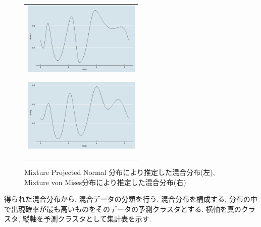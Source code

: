 \documentclass[a4j,12pt]{jarticle}
\begin{document}
\begin{figure}[tbp]
 \begin{tabular}{c}
\hspace{0.5cm}
 \begin{minipage}{0.5\hsize}
  \begin{center}
   \includegraphics[clip,height= 35mm]{data/mix_pn.png}
  \end{center}
  \label{pnmix}
 \end{minipage}
\hspace{-1.0cm}
 \begin{minipage}{0.5\hsize}
  \begin{center}
   \includegraphics[clip,height= 35mm]{data/mix_von.png}
  \end{center}
  \label{vonmix}
 \end{minipage}
  \end{tabular}
\caption{Mixture Projected Normal 分布により推定した混合分布(左), Mixture von Mises分布により推定した混合分布(右)}
\end{figure}


得られた混合分布から, 混合データの分類を行う. 混合分布を構成する, 分布の中で出現確率が最も高いものをそのデータの予測クラスタとする.
横軸を真のクラスタ, 縦軸を予測クラスタとして集計表を示す. 
\end{document}
